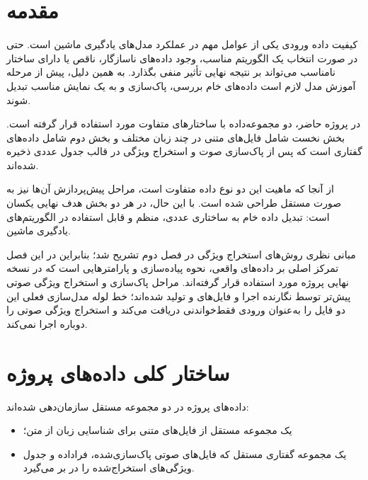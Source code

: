 \documentclass[12pt,a4paper,oneside]{report}
\begin{document}
\section{مقدمه}

کیفیت داده ورودی یکی از عوامل مهم در عملکرد مدل‌های یادگیری ماشین است. حتی در صورت انتخاب یک الگوریتم مناسب، وجود داده‌های ناسازگار، ناقص یا دارای ساختار نامناسب می‌تواند بر نتیجه نهایی تأثیر منفی بگذارد. به همین دلیل، پیش از مرحله آموزش مدل لازم است داده‌های خام بررسی، پاک‌سازی و به یک نمایش مناسب تبدیل شوند.

در پروژه حاضر، دو مجموعه‌داده با ساختارهای متفاوت مورد استفاده قرار گرفته است. بخش نخست شامل فایل‌های متنی در چند زبان مختلف و بخش دوم شامل داده‌های گفتاری است که پس از پاک‌سازی صوت و استخراج ویژگی در قالب جدول عددی ذخیره شده‌اند.

از آنجا که ماهیت این دو نوع داده متفاوت است، مراحل پیش‌پردازش آن‌ها نیز به صورت مستقل طراحی شده است. با این حال، در هر دو بخش هدف نهایی یکسان است: تبدیل داده خام به ساختاری عددی، منظم و قابل استفاده در الگوریتم‌های یادگیری ماشین.

مبانی نظری روش‌های استخراج ویژگی در فصل دوم تشریح شد؛ بنابراین در این فصل تمرکز اصلی بر داده‌های واقعی، نحوه پیاده‌سازی و پارامترهایی است که در نسخه نهایی پروژه مورد استفاده قرار گرفته‌اند. مراحل پاک‌سازی و استخراج ویژگی صوتی پیش‌تر توسط نگارنده اجرا و فایل‌های
و
تولید شده‌اند؛ خط لوله مدل‌سازی فعلی این دو فایل را به‌عنوان ورودی فقط‌خواندنی دریافت می‌کند و استخراج ویژگی صوتی را دوباره اجرا نمی‌کند.


\section{ساختار کلی داده‌های پروژه}

داده‌های پروژه در دو مجموعه مستقل سازمان‌دهی شده‌اند:

\begin{itemize}

	\item یک مجموعه مستقل از فایل‌های متنی برای شناسایی زبان از متن؛

	\item یک مجموعه گفتاری مستقل که فایل‌های صوتی پاک‌سازی‌شده، فراداده و جدول ویژگی‌های استخراج‌شده را در بر می‌گیرد.

\end{itemize}
\end{document}
